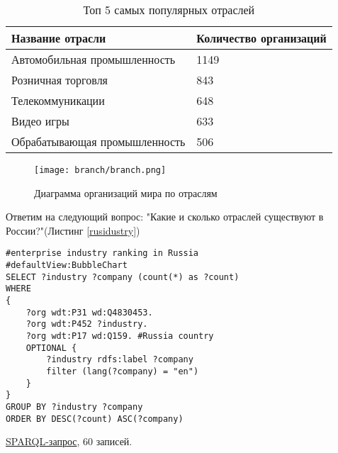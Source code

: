 \begin{table}[h]
\centering
\begin{tabular}{|l|l|}
\hline
\textbf{Название отрасли} & \textbf{Количество организаций} \\
\hline
Автомобильная промышленность & 1149 \\	
\hline
Розничная торговля & 843 \\
\hline
Телекоммуникации & 648 \\
\hline
Видео игры & 633 \\
\hline
Обрабатывающая промышленность & 506 \\
\hline
\end{tabular}
\caption{Топ 5 самых популярных отраслей}
\label{topindustry}
\end{table}


\begin{figure}[h]
	\texttt{[image: branch/branch.png]}
	\centering
	\caption{Диаграмма организаций мира по отраслям}
	\centering
	\label{industrygraph}
\end{figure}

\newpage

Ответим на следующий вопрос: "Какие и сколько отраслей существуют в России?"(Листинг \ref{rusidustry})

\begin{lstlisting}[language=SPARQL,label=rusidustry,caption=Диаграмма распределения организаций по отраслям в России]
#enterprise industry ranking in Russia
#defaultView:BubbleChart
SELECT ?industry ?company (count(*) as ?count) 
WHERE 
{
    ?org wdt:P31 wd:Q4830453.
    ?org wdt:P452 ?industry.
    ?org wdt:P17 wd:Q159. #Russia country
    OPTIONAL {
		?industry rdfs:label ?company
		filter (lang(?company) = "en")
	}
}
GROUP BY ?industry ?company
ORDER BY DESC(?count) ASC(?company)
\end{lstlisting}

\href{https://query.wikidata.org/#%23enterprise%20industry%20ranking%0A%23defaultView%3ABubbleChart%0ASELECT%20%3Findustry%20%3Fcompany%20%28count%28%2a%29%20as%20%3Fcount%29%20%0AWHERE%20%0A%7B%0A%20%20%20%20%3Forg%20wdt%3AP31%20wd%3AQ4830453.%0A%20%20%20%20%3Forg%20wdt%3AP452%20%3Findustry%20.%0A%20%20%20%20%3Forg%20wdt%3AP17%20wd%3AQ159.%20%23Russia%20country%0A%20%20%20%20OPTIONAL%20%7B%0A%09%09%3Findustry%20rdfs%3Alabel%20%3Fcompany%0A%09%09filter%20%28lang%28%3Fcompany%29%20%3D%20%22en%22%29%0A%09%7D%0A%7D%0AGROUP%20BY%20%3Findustry%20%3Fcompany%0AORDER%20BY%20DESC%28%3Fcount%29%20ASC%28%3Fcompany%29%0A}{SPARQL-запрос}, 60 записей.

